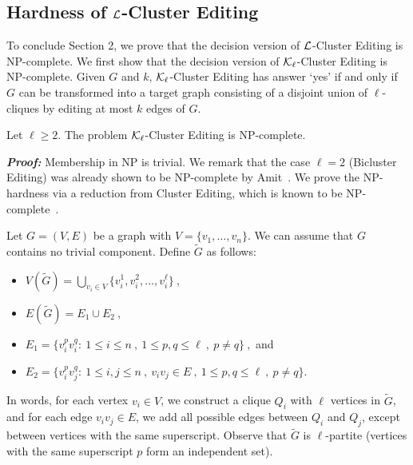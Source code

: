 \documentclass[12pt]{article}
\def\L{{\cal L}}
\def\KL{{\cal K}_{\ell}}
\begin{document}
\subsection{Hardness of $\L${\sc -Cluster Editing}}

To conclude Section 2, we prove that the decision version of $\L${\sc -Cluster Editing} is NP-complete.
We first show that the decision version of $\KL${\sc -Cluster Editing} is NP-complete. Given $G$ and $k$,
$\KL${\sc -Cluster Editing} has answer `yes' if and only if $G$ can be transformed
into a target graph consisting of a disjoint union of $\ell$-cliques by editing at most $k$ edges of $G$.

\begin{lema} \label{NP-hard L-cluster}
Let $\ell \geq 2$. The problem $\KL${\sc -Cluster Editing} is NP-complete.
\end{lema}

\noindent
\emph{\textbf{Proof:}}
Membership in NP is trivial. We remark that the case $\ell=2$ ({\sc Bicluster Editing})
was already shown to be NP-complete by Amit~\cite{TBGEP2004}.
We prove the NP-hardness via a reduction from {\sc Cluster Editing},
which is known to be NP-complete~\cite{SST2004}.

Let $G=(V,E)$ be a graph with $V=\{v_1, \ldots, v_n\}$.
We can assume that $G$ contains no trivial component.
Define $\widetilde{G}$ as follows:

\begin{itemize}

\item $V(\widetilde{G})= \bigcup_{v_i \in V} \{v_i^1, v_i^2, \ldots, v_i^{\ell}\} \ ,$

\item $E(\widetilde{G})= E_1 \cup E_2 \ ,$

\item $E_1 = \{v_i^p v_i^q: \ 1 \leq i \leq n \ , \ 1 \leq p,q \leq \ell \ , \ p\not= q\} \ ,$ and

\item $E_2 = \{ v_i^p v_j^q: \ 1 \leq i,j \leq n \ , \ v_i v_j \in E \ , \ 1 \leq p,q \leq \ell \ , \ p\not=q\}.$

\end{itemize}

In words, for each vertex $v_i \in V$, we construct a clique $Q_i$ with $\ell$ vertices in $\widetilde{G}$,
and for each edge $v_i v_j \in E$, we add all possible edges between $Q_i$ and $Q_j$, except between
vertices with the same superscript. Observe that $\widetilde{G}$ is $\ell$-partite (vertices with the same superscript $p$ form an independent set).
\end{document}
